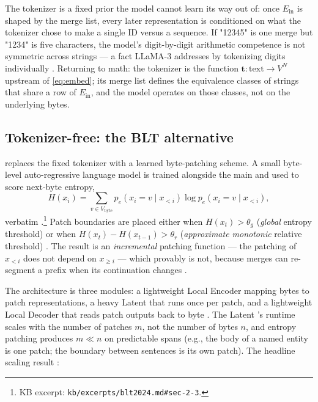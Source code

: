 \begin{analogy}
The tokenizer is a fixed prior the model cannot learn its way out of:
once $E_{\text{in}}$ is shaped by the merge list, every later
representation is conditioned on what the tokenizer chose to make a
single ID versus a sequence. If "12345" is one  merge but "1234" is
five characters, the model's digit-by-digit arithmetic competence is
not symmetric across strings — a fact LLaMA-3 addresses by tokenizing
digits individually \citep[\S 3.1]{meta-llama3}. Returning to math:
the tokenizer is the function $\mathbf{t}: \text{text} \to V^N$
upstream of \cref{eq:embed}; its merge list defines the equivalence
classes of strings that share a row of $E_{\text{in}}$, and the model
operates on those classes, not on the underlying bytes.
\end{analogy}

\subsection{Tokenizer-free: the BLT alternative}
\label{sec:tok-blt}

\citet{blt2024} replaces the fixed tokenizer with a learned
byte-patching scheme. A small byte-level auto-regressive language
model is trained alongside the main  and used to score next-byte
entropy,
\begin{equation}
H(x_i) = \sum_{v \in V_{\text{byte}}} p_e(x_i = v \mid x_{<i}) \log p_e(x_i = v \mid x_{<i}),
\label{eq:blt-entropy}
\end{equation}
verbatim \citep[Eq.~1]{blt2024}.\footnote{KB excerpt:
\texttt{kb/excerpts/blt2024.md\#sec-2-3}.} Patch boundaries are placed
either when $H(x_t) > \theta_g$ (\emph{global} entropy threshold) or
when $H(x_t) - H(x_{t-1}) > \theta_r$ (\emph{approximate monotonic}
relative threshold) \citep[\S 2.3]{blt2024}. The result is an
\emph{incremental} patching function — the patching of $x_{<i}$ does
not depend on $x_{\geq i}$ — which  provably is not, because 
merges can re-segment a prefix when its continuation changes
\citep[\S 2.4]{blt2024}.

The architecture is three modules: a lightweight Local Encoder mapping
bytes to patch representations, a heavy Latent  that runs
once per patch, and a lightweight Local Decoder that reads patch
outputs back to byte  \citep[\S 3]{blt2024}. The Latent
's runtime scales with the number of patches $m$, not the
number of bytes $n$, and entropy patching produces $m \ll n$ on
predictable spans (e.g., the body of a named entity is one patch; the
boundary between sentences is its own patch). The headline scaling
result \citep[\S 1, Fig.~1]{blt2024}:

